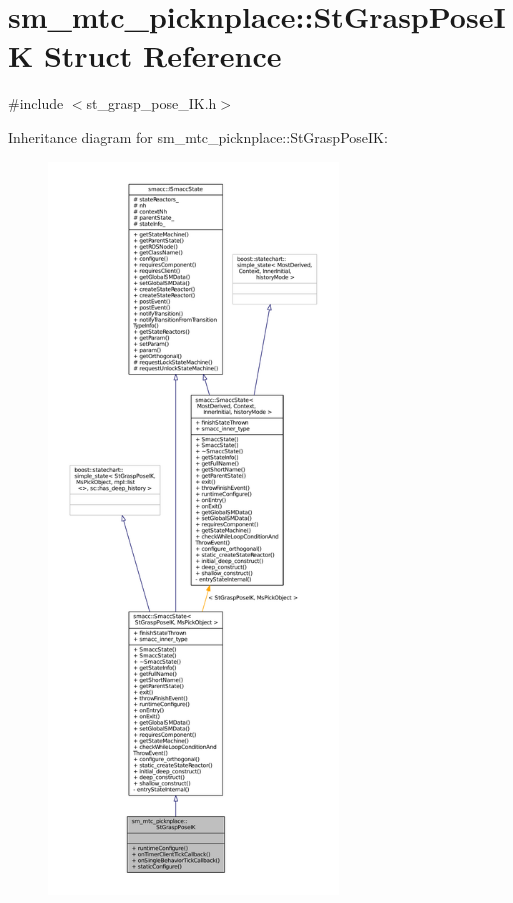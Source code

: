 \hypertarget{structsm__mtc__picknplace_1_1StGraspPoseIK}{}\section{sm\+\_\+mtc\+\_\+picknplace\+:\+:St\+Grasp\+Pose\+IK Struct Reference}
\label{structsm__mtc__picknplace_1_1StGraspPoseIK}


{\ttfamily \#include $<$st\+\_\+grasp\+\_\+pose\+\_\+\+I\+K.\+h$>$}



Inheritance diagram for sm\+\_\+mtc\+\_\+picknplace\+:\+:St\+Grasp\+Pose\+IK\+:
\nopagebreak
\begin{figure}[H]
\begin{center}
\leavevmode
\includegraphics[height=550pt]{structsm__mtc__picknplace_1_1StGraspPoseIK__inherit__graph}
\end{center}
\end{figure}


